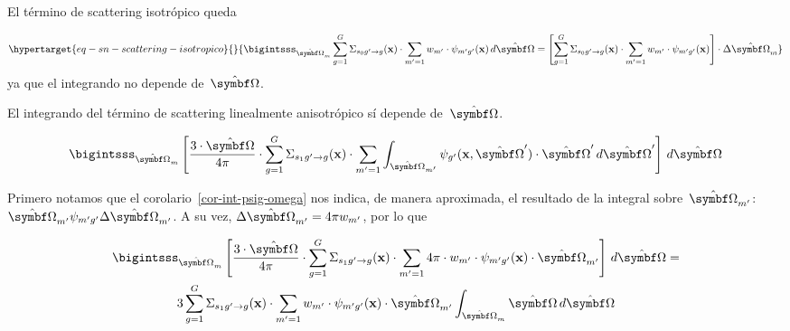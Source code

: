 \documentclass[
  12pt,
  a4paper,
  table]{scrbook}
\theoremstyle{plain}
\theoremstyle{definition}
\theoremstyle{plain}
\theoremstyle{plain}
\theoremstyle{remark}
\begin{document}
El término de \foreignlanguage{american}{scattering} isotrópico queda

\begin{equation}\protect\hypertarget{eq-sn-scattering-isotropico}{}{
\bigintsss_{\omegaversor_m} \sum_{g=1}^G \Sigma_{s_0 g^\prime \rightarrow g}(\vec{x})  \cdot \sum_{m^\prime=1} w_{m^\prime} \cdot \psi_{m^\prime g^\prime}(\vec{x}) \, d\omegaversor
=
\left[ \sum_{g=1}^G \Sigma_{s_0 g^\prime \rightarrow g}(\vec{x})  \cdot \sum_{m^\prime=1} w_{m^\prime} \cdot \psi_{m^\prime g^\prime}(\vec{x}) \right] \cdot \Delta \omegaversor_m
}\label{eq-sn-scattering-isotropico}\end{equation} ya que el integrando
no depende de~\(\omegaversor\).

El integrando del término de \foreignlanguage{american}{scattering}
linealmente anisotrópico sí depende de~\(\omegaversor\).

\[
\bigintsss_{\omegaversor_m} \left[ \frac{3 \cdot \omegaversor}{4\pi} \cdot \sum_{g=1}^G \Sigma_{s_1 g^\prime \rightarrow g}(\vec{x}) \cdot \sum_{m^\prime=1} \int_{\omegaversor_{m^\prime}} \psi_{g^\prime}(\vec{x},\omegaversor^\prime) \cdot \omegaversor^\prime \, d\omegaversor^\prime   \right] \, d\omegaversor
\]

Primero notamos que el corolario~\ref{cor-int-psig-omega} nos indica, de
manera aproximada, el resultado de la integral
sobre~\(\omegaversor_{m^\prime}\):
\(\omegaversor_{m^\prime} \psi_{m^\prime g^\prime} \Delta\omegaversor_{m^\prime}\).
A su vez, \(\Delta\omegaversor_{m^\prime} = 4\pi w_{m^\prime}\), por lo
que

\[
\begin{gathered}
\bigintsss_{\omegaversor_m} \left[ \frac{3 \cdot \omegaversor}{4\pi} \cdot \sum_{g=1}^G \Sigma_{s_1 g^\prime \rightarrow g}(\vec{x}) \cdot \sum_{m^\prime=1} 4\pi \cdot w_{m^\prime} \cdot \psi_{m^\prime g^\prime}(\vec{x}) \cdot \omegaversor_{m^\prime} \right] \, d\omegaversor
= \\
3 \sum_{g=1}^G \Sigma_{s_1 g^\prime \rightarrow g}(\vec{x}) \cdot \sum_{m^\prime=1} w_{m^\prime} \cdot \psi_{m^\prime g^\prime}(\vec{x}) \cdot \omegaversor_{m^\prime} \int_{\omegaversor_m} \omegaversor \, d\omegaversor
\end{gathered}
\]
\end{document}
